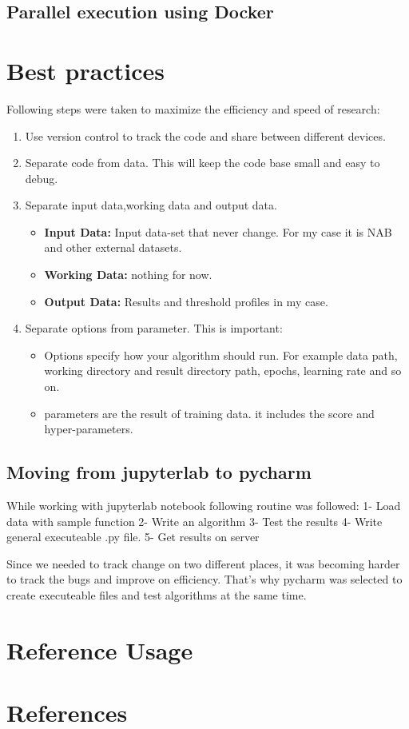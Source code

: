 \documentclass[12pt]{article}
\begin{document}
\subsection{Parallel execution using Docker}

\section{Best practices}
Following steps were taken to maximize the efficiency and speed of research:
\begin{enumerate}
	\item Use version control to track the code and share between different devices.
	\item Separate code from data. This will keep the code base small and easy to debug.
	\item Separate input data,working data and output data.
	\begin{itemize}
		\item \textbf{Input Data:} Input data-set that never change. For my case it is NAB and other external datasets.
		\item \textbf{Working Data:} nothing for now.
		\item \textbf{Output Data:} Results and threshold profiles in my case. 
	\end{itemize}
	\item Separate options from parameter. This is important:
 	\begin{itemize}
 		\item Options specify how your algorithm should run. For example data path, working directory and result directory path, epochs, learning rate and so on.
 		\item parameters are the result of training data. it includes the score and hyper-parameters. 
 	\end{itemize}
	
\end{enumerate}

\subsection{Moving from jupyterlab to pycharm}
While working with jupyterlab notebook following routine was followed:
1- Load data with sample function
2- Write an algorithm
3- Test the results
4- Write general executeable .py file.
5- Get results on server

Since we needed to track change on two different places,
it was becoming harder to track the bugs and improve on efficiency.
That's why pycharm was selected to create executeable files and test
algorithms at the same time.
\section{Reference Usage}

\section{References}
\begingroup
\nocite{*}
\renewcommand{\section}[2]{}



\endgroup
\end{document}
